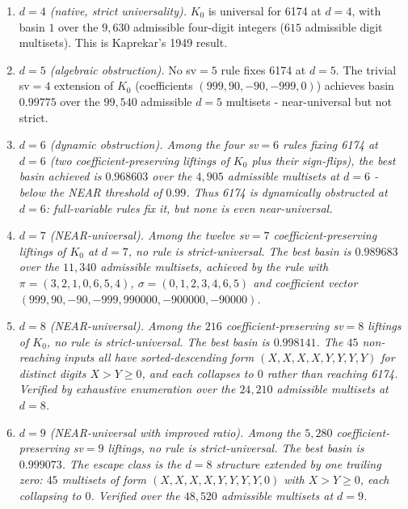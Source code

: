 \documentclass[11pt,letterpaper]{article}
\theoremstyle{paperstyle}
\theoremstyle{paperstyledef}
\theoremstyle{paperstylerem}
\begin{document}
\begin{enumerate}
\def\labelenumi{\arabic{enumi}.}
\item
  \emph{\(d = 4\) (native, strict universality).} \(K_0\) is universal
  for 6174 at \(d = 4\), with basin \(1\) over the \(9{,}630\)
  admissible four-digit integers (\(615\) admissible digit multisets).
  This is Kaprekar's 1949 result.
\item
  \emph{\(d = 5\) (algebraic obstruction).} No sv\(=5\) rule fixes 6174
  at \(d = 5\). The trivial sv\(=4\) extension of \(K_0\) (coefficients
  \((999, 90, -90, -999, 0)\)) achieves basin \(0.99775\) over the
  \(99{,}540\) admissible \(d = 5\) multisets - near-universal but not
  strict.
\item
  \emph{\(d = 6\) (dynamic obstruction). Among the four sv\(=6\) rules
  fixing 6174 at \(d = 6\) (two coefficient-preserving liftings of
  \(K_0\) plus their sign-flips), the best basin achieved is
  \(0.968603\) over the \(4{,}905\) admissible multisets at \(d = 6\)
  - below the NEAR threshold of \(0.99\). Thus 6174 is dynamically
  obstructed at \(d = 6\): full-variable rules fix it, but none is even
  near-universal.}
\item
  \emph{\(d = 7\) (NEAR-universal). Among the twelve sv\(=7\)
  coefficient-preserving liftings of \(K_0\) at \(d = 7\), no rule is
  strict-universal. The best basin is \(0.989683\) over the \(11{,}340\)
  admissible multisets, achieved by the rule with
  \(\pi = (3, 2, 1, 0, 6, 5, 4)\), \(\sigma = (0, 1, 2, 3, 4, 6, 5)\)
  and coefficient vector
  \((999, 90, -90, -999, 990000, -900000, -90000)\).}
\item
  \emph{\(d = 8\) (NEAR-universal). Among the \(216\)
  coefficient-preserving sv\(=8\) liftings of \(K_0\), no rule is
  strict-universal. The best basin is \(0.998141\). The \(45\)
  non-reaching inputs all have sorted-descending form
  \((X, X, X, X, Y, Y, Y, Y)\) for distinct digits \(X > Y \geq 0\), and
  each collapses to \(0\) rather than reaching 6174. Verified by
  exhaustive enumeration over the \(24{,}210\) admissible multisets at
  \(d = 8\).}
\item
  \emph{\(d = 9\) (NEAR-universal with improved ratio). Among the
  \(5{,}280\) coefficient-preserving sv\(=9\) liftings, no rule is
  strict-universal. The best basin is \(0.999073\). The escape class is
  the \(d = 8\) structure extended by one trailing zero: \(45\)
  multisets of form \((X, X, X, X, Y, Y, Y, Y, 0)\) with
  \(X > Y \geq 0\), each collapsing to \(0\). Verified over the
  \(48{,}520\) admissible multisets at \(d = 9\).}
\end{enumerate}
\end{document}
